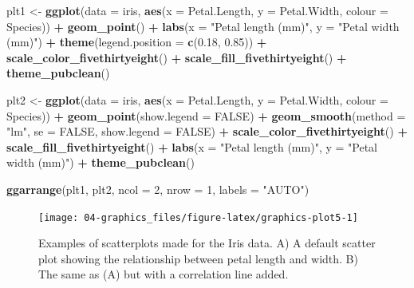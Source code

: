 \documentclass[english,10pt,a4paper,oneside]{book}
\newenvironment{Shaded}{\begin{snugshade}}{\end{snugshade}}
\newcommand{\DataTypeTok}[1]{\textcolor[rgb]{0.13,0.29,0.53}{#1}}
\newcommand{\DecValTok}[1]{\textcolor[rgb]{0.00,0.00,0.81}{#1}}
\newcommand{\FloatTok}[1]{\textcolor[rgb]{0.00,0.00,0.81}{#1}}
\newcommand{\KeywordTok}[1]{\textcolor[rgb]{0.13,0.29,0.53}{\textbf{#1}}}
\newcommand{\NormalTok}[1]{#1}
\newcommand{\OperatorTok}[1]{\textcolor[rgb]{0.81,0.36,0.00}{\textbf{#1}}}
\newcommand{\OtherTok}[1]{\textcolor[rgb]{0.56,0.35,0.01}{#1}}
\newcommand{\StringTok}[1]{\textcolor[rgb]{0.31,0.60,0.02}{#1}}
\theoremstyle{definition}
\theoremstyle{definition}
\theoremstyle{definition}
\theoremstyle{remark}
\begin{document}
\begin{Shaded}
\begin{Highlighting}[]
\NormalTok{plt1 <-}\StringTok{ }\KeywordTok{ggplot}\NormalTok{(}\DataTypeTok{data =}\NormalTok{ iris, }\KeywordTok{aes}\NormalTok{(}\DataTypeTok{x =}\NormalTok{ Petal.Length, }\DataTypeTok{y =}\NormalTok{ Petal.Width, }\DataTypeTok{colour =}\NormalTok{ Species)) }\OperatorTok{+}
\StringTok{  }\KeywordTok{geom_point}\NormalTok{() }\OperatorTok{+}
\StringTok{  }\KeywordTok{labs}\NormalTok{(}\DataTypeTok{x =} \StringTok{"Petal length (mm)"}\NormalTok{, }\DataTypeTok{y =} \StringTok{"Petal width (mm)"}\NormalTok{) }\OperatorTok{+}
\StringTok{  }\KeywordTok{theme}\NormalTok{(}\DataTypeTok{legend.position =} \KeywordTok{c}\NormalTok{(}\FloatTok{0.18}\NormalTok{, }\FloatTok{0.85}\NormalTok{)) }\OperatorTok{+}
\StringTok{  }\KeywordTok{scale_color_fivethirtyeight}\NormalTok{() }\OperatorTok{+}
\StringTok{  }\KeywordTok{scale_fill_fivethirtyeight}\NormalTok{() }\OperatorTok{+}\StringTok{ }
\StringTok{  }\KeywordTok{theme_pubclean}\NormalTok{()}

\NormalTok{plt2 <-}\StringTok{ }\KeywordTok{ggplot}\NormalTok{(}\DataTypeTok{data =}\NormalTok{ iris, }\KeywordTok{aes}\NormalTok{(}\DataTypeTok{x =}\NormalTok{ Petal.Length, }\DataTypeTok{y =}\NormalTok{ Petal.Width, }\DataTypeTok{colour =}\NormalTok{ Species)) }\OperatorTok{+}
\StringTok{  }\KeywordTok{geom_point}\NormalTok{(}\DataTypeTok{show.legend =} \OtherTok{FALSE}\NormalTok{) }\OperatorTok{+}
\StringTok{  }\KeywordTok{geom_smooth}\NormalTok{(}\DataTypeTok{method =} \StringTok{"lm"}\NormalTok{, }\DataTypeTok{se =} \OtherTok{FALSE}\NormalTok{, }\DataTypeTok{show.legend =} \OtherTok{FALSE}\NormalTok{) }\OperatorTok{+}
\StringTok{  }\KeywordTok{scale_color_fivethirtyeight}\NormalTok{() }\OperatorTok{+}
\StringTok{  }\KeywordTok{scale_fill_fivethirtyeight}\NormalTok{() }\OperatorTok{+}
\StringTok{  }\KeywordTok{labs}\NormalTok{(}\DataTypeTok{x =} \StringTok{"Petal length (mm)"}\NormalTok{, }\DataTypeTok{y =} \StringTok{"Petal width (mm)"}\NormalTok{) }\OperatorTok{+}\StringTok{ }
\StringTok{  }\KeywordTok{theme_pubclean}\NormalTok{()}

\KeywordTok{ggarrange}\NormalTok{(plt1, plt2, }\DataTypeTok{ncol =} \DecValTok{2}\NormalTok{, }\DataTypeTok{nrow =} \DecValTok{1}\NormalTok{, }\DataTypeTok{labels =} \StringTok{"AUTO"}\NormalTok{)}
\end{Highlighting}
\end{Shaded}

\begin{figure}
\texttt{[image: 04-graphics\_files/figure-latex/graphics-plot5-1]} \caption{Examples of scatterplots made for the Iris data. A) A default scatter plot showing the relationship between petal length and width. B) The same as (A) but with a correlation line added.}\label{fig:graphics-plot5}
\end{figure}
\end{document}
